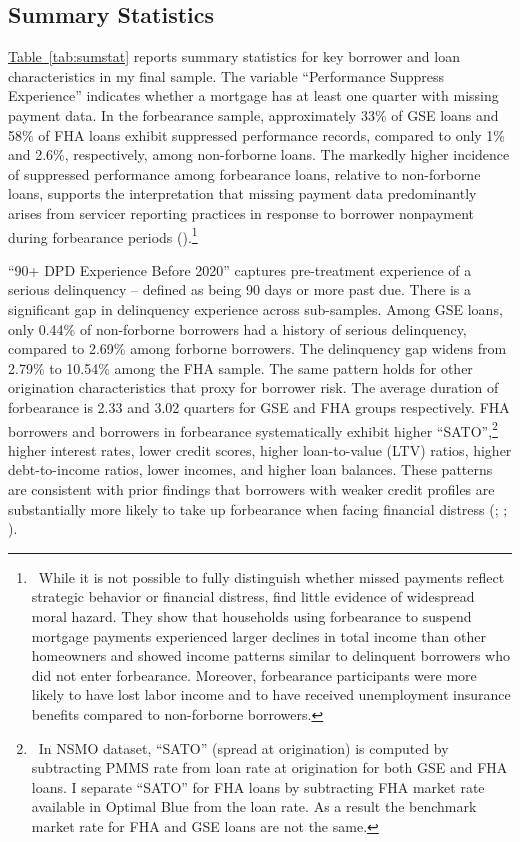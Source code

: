 \documentclass[11pt]{article}
\begin{document}
\subsection{Summary Statistics}

\hyperref[tab:sumstat]{Table~\ref*{tab:sumstat}} reports summary statistics for key borrower and loan characteristics in my final sample. The variable ``Performance Suppress Experience'' indicates whether a mortgage has at least one quarter with missing payment data. In the forbearance sample, approximately 33\% of GSE loans and 58\% of FHA loans exhibit suppressed performance records, compared to only 1\% and 2.6\%, respectively, among non-forborne loans. The markedly higher incidence of suppressed performance among forbearance loans, relative to non-forborne loans, supports the interpretation that missing payment data predominantly arises from servicer reporting practices in response to borrower nonpayment during forbearance periods (\citet{cfpb2024}).\footnote{~While it is not possible to fully distinguish whether missed payments reflect strategic behavior or financial distress, \citet{farrell2020did} find little evidence of widespread moral hazard. They show that households using forbearance to suspend mortgage payments experienced larger declines in total income than other homeowners and showed income patterns similar to delinquent borrowers who did not enter forbearance. Moreover, forbearance participants were more likely to have lost labor income and to have received unemployment insurance benefits compared to non-forborne borrowers.} 

 ``90+ DPD Experience Before 2020'' captures pre-treatment experience of a serious delinquency -- defined as being 90 days or more past due. There is a significant gap in delinquency experience across sub-samples. Among GSE loans, only 0.44\% of non-forborne borrowers had a history of serious delinquency, compared to 2.69\% among forborne borrowers. The delinquency gap widens from 2.79\% to 10.54\% among the FHA sample. The same pattern holds for other origination characteristics that proxy for borrower risk. The average duration of forbearance is 2.33 and 3.02 quarters for GSE and FHA groups respectively. FHA borrowers and borrowers in forbearance systematically exhibit higher  ``SATO'',\footnote{~In NSMO dataset, ``SATO'' (spread at origination) is computed by subtracting PMMS rate from loan rate at origination for both GSE and FHA loans. I separate ``SATO'' for FHA loans by subtracting FHA market rate available in Optimal Blue from the loan rate. As a result the benchmark market rate for FHA and GSE loans are not the same.} higher interest rates, lower credit scores, higher loan-to-value (LTV) ratios, higher debt-to-income ratios, lower incomes, and higher loan balances. These patterns are consistent with prior findings that borrowers with weaker credit profiles are substantially more likely to take up forbearance when facing financial distress (\citet{farrell2020did}; \citet{cherry2021government}; \citet{an2022inequality}).
\end{document}
